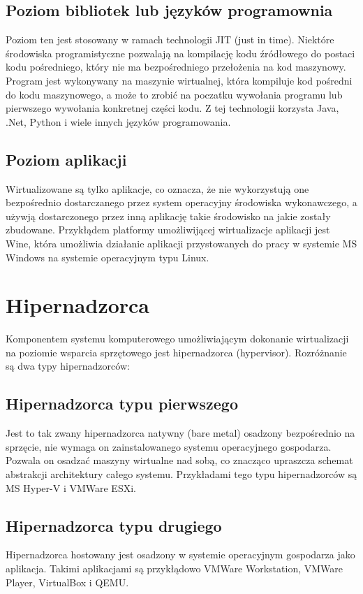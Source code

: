 \documentclass[polish, a4paper, 12pt, oneside]{book}
\begin{document}
\subsection {Poziom bibliotek lub języków programownia}
Poziom ten jest stosowany w ramach technologii JIT (just in time). Niektóre środowiska programistyczne pozwalają na kompilację kodu źródłowego do postaci kodu pośredniego, który nie ma bezpośredniego przełożenia na kod maszynowy. Program jest wykonywany na maszynie wirtualnej, która kompiluje kod pośredni do kodu maszynowego, a może to zrobić na poczatku wywołania programu lub pierwszego wywołania konkretnej części kodu. Z tej technologii korzysta Java, .Net, Python i wiele innych języków programowania. 
\subsection {Poziom aplikacji}
Wirtualizowane są tylko aplikacje, co oznacza, że nie wykorzystują one bezpośrednio dostarczanego przez system operacyjny środowiska wykonawczego, a używją dostarczonego przez inną aplikację takie środowisko na jakie zostały zbudowane. Przykłądem platformy umożliwijącej wirtualizacje aplikacji jest Wine, która umożliwia działanie aplikacji przystowanych do pracy w systemie MS Windows na systemie operacyjnym typu Linux.
 
\section{Hipernadzorca}
Komponentem systemu komputerowego umożliwiającym dokonanie wirtualizacji na poziomie wsparcia sprzętowego jest hipernadzorca (hypervisor). Rozróżnanie są dwa typy hipernadzorców:

\subsection {Hipernadzorca typu pierwszego} 
Jest to tak zwany hipernadzorca natywny (bare metal) osadzony bezpośrednio na sprzęcie, nie wymaga on zainstalowanego systemu operacyjnego gospodarza. Pozwala on osadzać maszyny wirtualne nad sobą, co znacząco upraszcza schemat abstrakcji architektury całego systemu. Przykładami tego typu hipernadzorców są MS Hyper-V i VMWare ESXi.

\subsection {Hipernadzorca typu drugiego} 
Hipernadzorca hostowany jest osadzony w systemie operacyjnym gospodarza jako aplikacja. Takimi aplikacjami są przykłądowo VMWare Workstation, VMWare Player, VirtualBox i QEMU.
\end{document}
